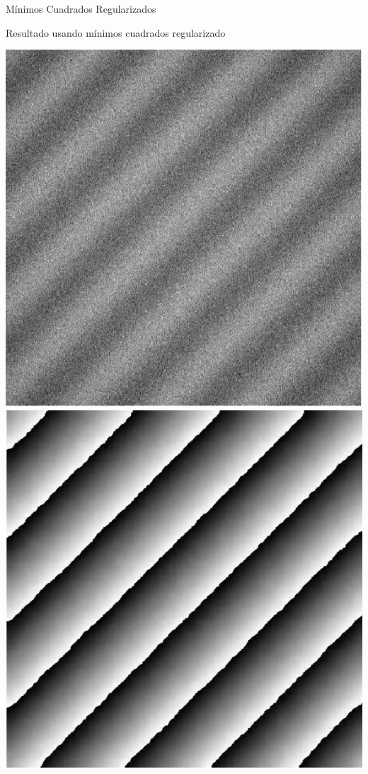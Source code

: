 \documentclass[]{beamer}
\begin{document}
\begin{frame}{M\'inimos Cuadrados Regularizados}

Resultado usando m\'inimos cuadrados regularizado
\begin{center}
\includegraphics[scale=0.32]{Images/InterferogramLS.png} \quad \quad
\includegraphics[scale=0.32]{Images/FaseMinCuaReg.png}

\end{center}
\end{frame}
\end{document}
